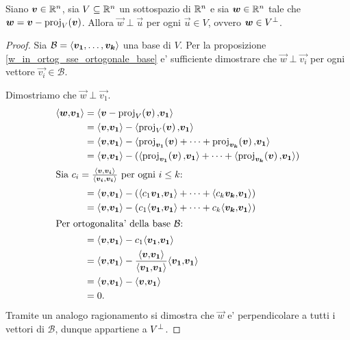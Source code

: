 \begin{proposition}\label{(v-proj)_in_ortogonale}
    Siano $\vec v \in \R^n$, sia $V \subseteq \R^n$ un sottospazio di $\R^n$ e sia $\vec w \in \R^n$ tale che $\vec w = \vec v - \proj{\vec v}{V}$. Allora $\vec w \perp \vec u$ per ogni $\vec u \in V$, ovvero $\vec w \in \ortog{V}$.
\end{proposition}
\begin{proof}
    Sia $\mathcal{B} = \basis{\vec{v_1}, \dots, \vec{v_k}}$ una base di $V$. Per la proposizione \ref{w_in_ortog_sse_ortogonale_base} e' sufficiente dimostrare che $\vec{w} \perp \vec{v_i}$ per ogni vettore $\vec{v_i} \in \mathcal{B}$.

    Dimostriamo che $\vec w \perp \vec{v_1}$.
    \begin{align*}
        \innerprod{\vec w}{\vec{v_1}} &= \innerprod{\vec v - \proj{\vec v}{V}}{\vec{v_1}} \\
        &= \innerprod{\vec v}{\vec{v_1}} - \innerprod{\proj{\vec v}{V}}{\vec{v_1}} \\
        &= \innerprod{\vec v}{\vec{v_1}} - \innerprod{\proj{\vec v}{\vec{v_1}} + \dots + \proj{\vec v}{\vec{v_k}}}{\vec{v_1}} \\
        &= \innerprod{\vec v}{\vec{v_1}} - (\innerprod{\proj{\vec v}{\vec{v_1}}}{\vec{v_1}} + \dots + \innerprod{\proj{\vec v}{\vec{v_k}}}{\vec{v_1}}) \\
        \intertext{Sia $c_i = \frac{\innerprod{\vec v}{\vec{v_i}}}{\innerprod{\vec{v_i}}{\vec{v_i}}}$ per ogni $i \leq k$:}
        &= \innerprod{\vec v}{\vec{v_1}} - (\innerprod{c_1\vec{v_1}}{\vec{v_1}} + \dots + \innerprod{c_k\vec{v_k}}{\vec{v_1}}) \\
        &= \innerprod{\vec v}{\vec{v_1}} - (c_1\innerprod{\vec{v_1}}{\vec{v_1}} + \dots + c_k\innerprod{\vec{v_k}}{\vec{v_1}}) \\
        \intertext{Per ortogonalita' della base $\mathcal{B}$:}
        &= \innerprod{\vec v}{\vec{v_1}} - c_1\innerprod{\vec{v_1}}{\vec{v_1}}\\
        &= \innerprod{\vec v}{\vec{v_1}} - \frac{\innerprod{\vec v}{\vec{v_1}}}{\innerprod{\vec{v_1}}{\vec{v_1}}}\innerprod{\vec{v_1}}{\vec{v_1}} \\
        &= \innerprod{\vec v}{\vec{v_1}} - \innerprod{\vec v}{\vec{v_1}}\\
        &= 0.
    \end{align*}
    Tramite un analogo ragionamento si dimostra che $\vec w$ e' perpendicolare a tutti i vettori di $\mathcal{B}$, dunque appartiene a $\ortog{V}$.
\end{proof}

